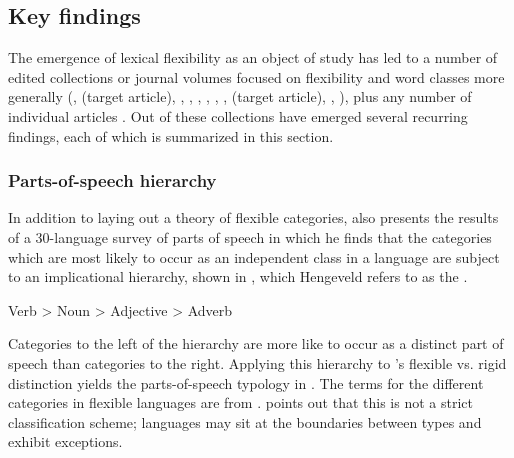 \subsection{Key findings}
\label{sec:2.3.2}

The emergence of lexical flexibility as an object of study has led to a number of edited collections or journal volumes focused on flexibility and word classes more generally (\cite{VogelComrie2000}, \cite{EvansOsada2005} (target article), \cite{AnsaldoDonPfau2010}, \cite{LoisVapnarsky2003}, \cite{RijkhoffLier2013}, \cite{SimoneMasini2014}, \cite{BlaszczakKlimekJankowskaMigdalski2015}, \cite{VapnarskyVeneziano2017b}, \cite{Lier2017} (target article), \cite{VapnarskyVeneziano2017a}, \cite{CuyckensHeyvaertHartmann2019}), plus any number of individual articles . Out of these collections have emerged several recurring findings, each of which is summarized in this section.

\subsubsection{Parts-of-speech hierarchy}
\label{sec:2.3.2.1}

In addition to laying out a theory of flexible categories, \textcite{Hengeveld1992} also presents the results of a 30-language survey of parts of speech in which he finds that the categories which are most likely to occur as an independent class in a language are subject to an implicational hierarchy, shown in , which Hengeveld refers to as the .

\begin{exe}
  \ex\label{ex:2.8} Verb > Noun > Adjective > Adverb
\end{exe}

\noindent Categories to the left of the hierarchy are more like to occur as a distinct part of speech than categories to the right. Applying this hierarchy to \citeauthor{Hengeveld1992}'s flexible vs. rigid distinction yields the parts-of-speech typology in  . The terms for the different categories in flexible languages are from \textcite{HengeveldRijkhoffSiewierska2004}. \citeauthor{Hengeveld1992} points out that this is not a strict classification scheme; languages may sit at the boundaries between types and exhibit exceptions.


